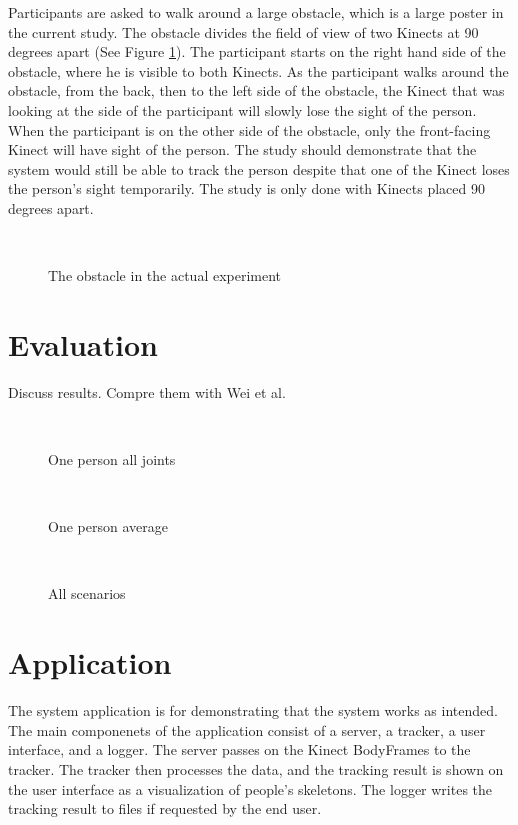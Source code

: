 \documentclass{sigchi}
\begin{document}
Participants are asked to walk around a large obstacle, which is a large poster in the current study. The obstacle divides the field of view of two Kinects at 90 degrees apart (See Figure \ref{fig:studies_obstacle}). The participant starts on the right hand side of the obstacle, where he is visible to both Kinects. As the participant walks around the obstacle, from the back, then to the left side of the obstacle, the Kinect that was looking at the side of the participant will slowly lose the sight of the person. When the participant is on the other side of the obstacle, only the front-facing Kinect will have sight of the person. The study should demonstrate that the system would still be able to track the person despite that one of the Kinect loses the person's sight temporarily. The study is only done with Kinects placed 90 degrees apart.

\begin{figure}[!h]
  \centering
  
  \caption{The obstacle in the actual experiment}~\label{fig:studies_obstacle}
\end{figure}

\section{Evaluation}

Discuss results. Compre them with Wei et al.

\begin{figure}[!h]
  \centering
  
  \caption{One person all joints}~\label{fig:one_person_all}
\end{figure}

\begin{figure}[!h]
  \centering
  
  \caption{One person average}~\label{fig:one_person_average}
\end{figure}

\begin{figure}[!h]
  \centering
  
  \caption{All scenarios}~\label{fig:scenarios}
\end{figure}

\section{Application}

The system application is for demonstrating that the system works as intended. The main componenets of the application consist of a server, a tracker, a user interface, and a logger. The server passes on the Kinect BodyFrames to the tracker. The tracker then processes the data, and the tracking result is shown on the user interface as a visualization of people's skeletons. The logger writes the tracking result to files if requested by the end user.
\end{document}
